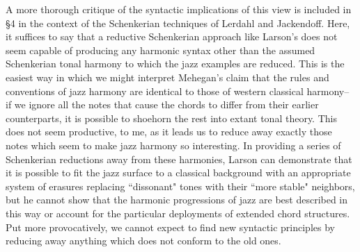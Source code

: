 A more thorough critique of the syntactic implications of this view is included in \S 4 in the context of the Schenkerian techniques of Lerdahl and Jackendoff.  Here, it suffices to say that a reductive Schenkerian approach like Larson's does not seem capable of producing any harmonic syntax other than the assumed Schenkerian tonal harmony to which the jazz examples are reduced.  This is the easiest way in which we might interpret Mehegan's claim that the rules and conventions of jazz harmony are identical to those of western classical harmony-- if we ignore all the notes that cause the chords to differ from their earlier counterparts, it is possible to shoehorn the rest into extant tonal theory.  This does not seem productive, to me, as it leads us to reduce away exactly those notes which seem to make jazz harmony so interesting.  In providing a series of Schenkerian reductions away from these harmonies, Larson can demonstrate that it is possible to fit the jazz surface to a classical background with an appropriate system of erasures replacing ``dissonant" tones with their ``more stable" neighbors, but he cannot show that the harmonic progressions of jazz are best described in this way or account for the particular deployments of extended chord structures.  Put more provocatively, we cannot expect to find new syntactic principles by reducing away anything which does not conform to the old ones.

